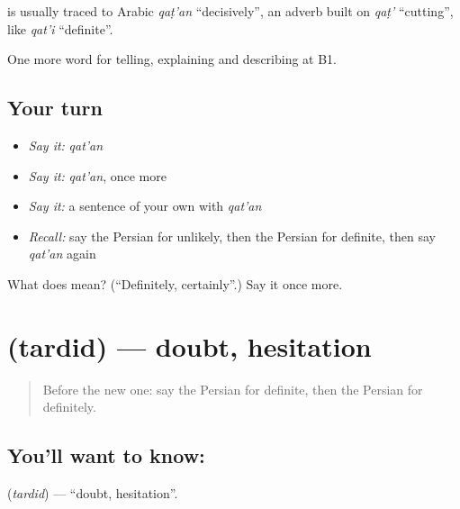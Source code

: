 \begin{cousinweb}
\textbf{} is usually traced to Arabic \emph{qaṭ'an} \textquotedblleft{}decisively\textquotedblright{}, an adverb built on \emph{qaṭ'} \textquotedblleft{}cutting\textquotedblright{}, like \emph{qat'i} \textquotedblleft{}definite\textquotedblright{}.
\end{cousinweb}

\begin{grammarlens}[title={What you've built}]
One more word for telling, explaining and describing at B1.
\end{grammarlens}

\subsection*{Your turn}
\begin{itemize}
\raggedright
  \item \emph{Say it:} \emph{qat'an}
  \item \emph{Say it:} \emph{qat'an}, once more
  \item \emph{Say it:} a sentence of your own with \emph{qat'an}
  \item \emph{Recall:} say the Persian for unlikely, then the Persian for definite, then say \emph{qat'an} again
\end{itemize}

\begin{tcolorbox}[breakable,colback=teal!4,colframe=teal!35!black,title={Before you move on}]
What does  mean? (\textquotedblleft{}Definitely, certainly\textquotedblright{}.) Say it once more.
\end{tcolorbox}
\section[\texorpdfstring{\fa{تردید} (tardid)}{تردید (tardid)}]{ (tardid) — doubt, hesitation}

\label{lesson:FA-C393-tardid}



\begin{quote}
Before the new one: say the Persian for definite, then the Persian for definitely.
\end{quote}

\subsection*{You'll want to know: }
\textbf{} (\emph{tardid}) — \textquotedblleft{}doubt, hesitation\textquotedblright{}.

